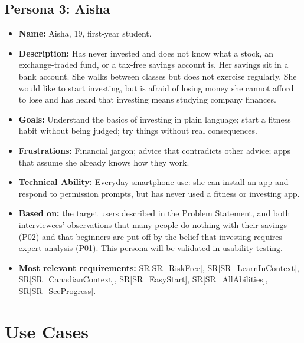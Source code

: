 \documentclass[12pt]{article}
\newcommand{\srref}[1]{SR\ref{#1}}
\begin{document}
\subsection{Persona 3: Aisha}
\begin{itemize}
  \item \textbf{Name:} Aisha, 19, first-year student.
  \item \textbf{Description:} Has never invested and does not know what a stock,
        an exchange-traded fund, or a tax-free savings account is. Her savings sit in
        a bank account. She walks between classes but does not exercise regularly.
        She would like to start investing, but is afraid of losing money she cannot
        afford to lose and has heard that investing means studying company finances.
  \item \textbf{Goals:} Understand the basics of investing in plain language;
        start a fitness habit without being judged; try things without real
        consequences.
  \item \textbf{Frustrations:} Financial jargon; advice that contradicts other
        advice; apps that assume she already knows how they work.
  \item \textbf{Technical Ability:} Everyday smartphone use: she can install an
        app and respond to permission prompts, but has never used a fitness or
        investing app.
  \item \textbf{Based on:} the target users described in the Problem Statement,
        and both interviewees' observations that many people do nothing with their
        savings (P02) and that beginners are put off by the belief that investing
        requires expert analysis (P01). This persona will be validated in usability
        testing.
  \item \textbf{Most relevant requirements:} \srref{SR_RiskFree},
        \srref{SR_LearnInContext}, \srref{SR_CanadianContext}, \srref{SR_EasyStart},
        \srref{SR_AllAbilities}, \srref{SR_SeeProgress}.
\end{itemize}


\section{Use Cases}
\end{document}
